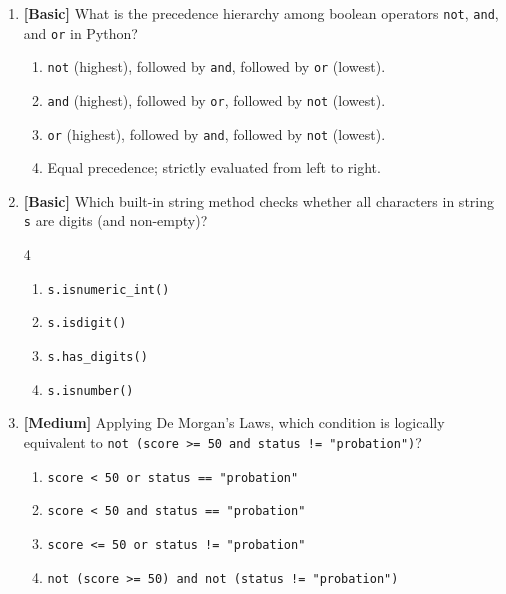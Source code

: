 \documentclass[11pt,a4paper]{article}
\begin{document}
\newpage


\begin{enumerate}[label=\textbf{Q\arabic*.},leftmargin=1.8em,itemsep=0.7pt,topsep=0.3pt,resume]

\item \textbf{[Basic]} What is the precedence hierarchy among boolean operators \texttt{not}, \texttt{and}, and \texttt{or} in Python?
\begin{enumerate}[label=\Alph*.,leftmargin=1.8em]
  \item \texttt{not} (highest), followed by \texttt{and}, followed by \texttt{or} (lowest).
  \item \texttt{and} (highest), followed by \texttt{or}, followed by \texttt{not} (lowest).
  \item \texttt{or} (highest), followed by \texttt{and}, followed by \texttt{not} (lowest).
  \item Equal precedence; strictly evaluated from left to right.
\end{enumerate}

\item \textbf{[Basic]} Which built-in string method checks whether all characters in string \texttt{s} are digits (and non-empty)?
\begin{multicols}{4}
\begin{enumerate}[label=\Alph*.]
  \item \texttt{s.isnumeric\_int()}
  \item \texttt{s.isdigit()}
  \item \texttt{s.has\_digits()}
  \item \texttt{s.isnumber()}
\end{enumerate}
\end{multicols}

\item \textbf{[Medium]} Applying De Morgan's Laws, which condition is logically equivalent to \texttt{not (score >= 50 and status != "probation")}?
\begin{enumerate}[label=\Alph*.,leftmargin=1.8em]
  \item \texttt{score < 50 or status == "probation"}
  \item \texttt{score < 50 and status == "probation"}
  \item \texttt{score <= 50 or status != "probation"}
  \item \texttt{not (score >= 50) and not (status != "probation")}
\end{enumerate}


\end{enumerate}
\end{document}
